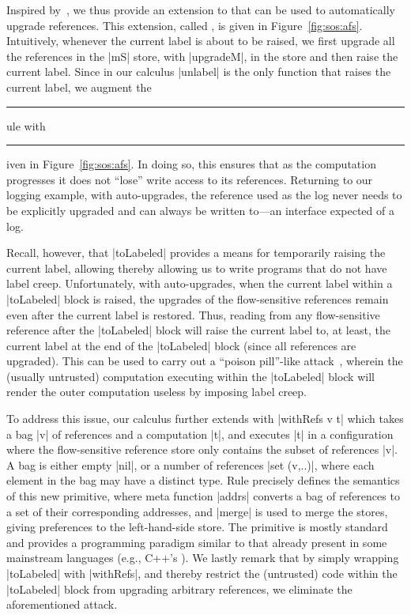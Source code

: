 Inspired by~\citep{Hedin13}, we thus provide an extension to \liofs{} that can
be used to automatically upgrade references.
%
This extension, called \lioafs{}, is given in Figure~\ref{fig:sos:afs}.
%
Intuitively, whenever the current label is about to be raised, we first upgrade
all the references in the |mS| store, with |upgradeM|, in the store and then
raise the current label.
%
Since in our calculus |unlabel| is the only function that raises the current
label, we augment the \rule{unlabel} rule with \rule{unlabel-au} given in
Figure~\ref{fig:sos:afs}.
%
In doing so, this ensures that as the computation progresses it does not
``lose'' write access to its references.
%
Returning to our logging example, with auto-upgrades, the reference used as the
log never needs to be explicitly upgraded and can always be written to---an
interface expected of a log.

Recall, however, that |toLabeled| provides a means for temporarily raising the
current label, allowing thereby allowing us to write programs that do not have
label creep.
%
Unfortunately, with auto-upgrades, when the current label within a |toLabeled|
block is raised, the upgrades of the flow-sensitive references remain even
after the current label is restored.
%
Thus, reading from any flow-sensitive reference after the |toLabeled|
block will raise the current label to, at least, the current label at the end
of the |toLabeled| block (since all references are upgraded).
%
This can be used to carry out a ``poison pill''-like attack~, wherein
the (usually untrusted) computation executing within the |toLabeled| block will
render the outer computation useless by imposing label creep.

To address this issue, our \lioafs{} calculus further extends \liofs{} with
|withRefs v t| which takes a bag |v| of references and a computation |t|, and
executes |t| in a configuration where the flow-sensitive reference store only
contains the subset of references |v|.
%
A bag is either empty |nil|, or a number of references |set (v,..)|, where each
element in the bag may have a distinct type.
%
Rule  precisely defines the semantics of this new primitive,
where meta function |addrs| converts a bag of references to a set of their
corresponding addresses, and |merge| is used to merge the stores, giving
preferences to the left-hand-side store.
%
The primitive is mostly standard and provides a programming paradigm similar to
that already present in some mainstream languages (e.g., C++'s ).
%
We lastly remark that by simply wrapping |toLabeled| with |withRefs|, and
thereby restrict the (untrusted) code within the |toLabeled| block from
upgrading arbitrary references, we eliminate the aforementioned attack.


